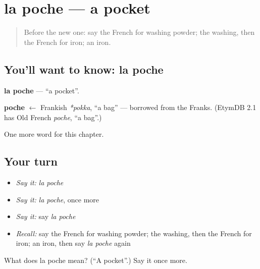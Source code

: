 \section[la poche]{la poche — a pocket}

\label{lesson:FR-C115-poche}



\begin{quote}
Before the new one: say the French for washing powder; the washing, then the French for iron; an iron.
\end{quote}

\subsection*{You'll want to know: la poche}
\textbf{la poche} — \textquotedblleft{}a pocket\textquotedblright{}.

\begin{cousinweb}
\textbf{poche} $\leftarrow$ Frankish \emph{*pokka}, \textquotedblleft{}a bag\textquotedblright{} — borrowed from the Franks. (EtymDB 2.1 has Old French \emph{poche}, \textquotedblleft{}a bag\textquotedblright{}.)
\end{cousinweb}

\begin{grammarlens}[title={What you've built}]
One more word for this chapter.
\end{grammarlens}

\subsection*{Your turn}
\begin{itemize}
\raggedright
  \item \emph{Say it:} \emph{la poche}
  \item \emph{Say it:} \emph{la poche}, once more
  \item \emph{Say it:} say \emph{la poche}
  \item \emph{Recall:} say the French for washing powder; the washing, then the French for iron; an iron, then say \emph{la poche} again
\end{itemize}

\begin{tcolorbox}[breakable,colback=teal!4,colframe=teal!35!black,title={Before you move on}]
What does la poche mean? (\textquotedblleft{}A pocket\textquotedblright{}.) Say it once more.
\end{tcolorbox}

